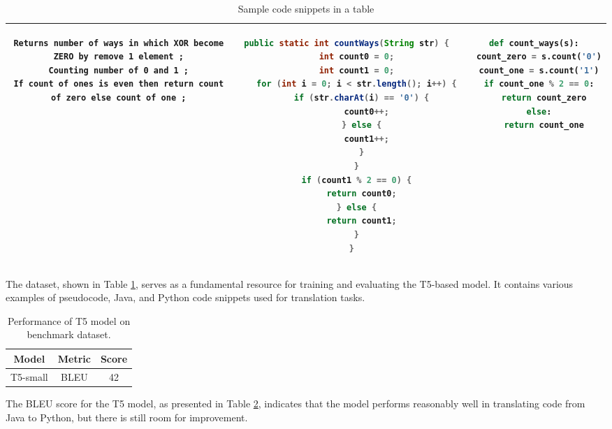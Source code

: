 \documentclass{dhbenelux}
\begin{document}
\begin{table}[h!]
{\begin{tabular}{|c|c|c|}
\begin{minipage}[t]{0.3\textwidth}
\begin{lstlisting}[basicstyle=\ttfamily\scriptsize, breaklines=true]
Returns number of ways in which XOR become ZERO by remove 1 element ;
Counting number of 0 and 1 ;
If count of ones is even then return count of zero else count of one ;
\end{lstlisting}
\end{minipage}
&
\begin{minipage}[t]{0.3\textwidth}
\begin{lstlisting}[language=Java, basicstyle=\ttfamily\scriptsize, breaklines=true]
public static int countWays(String str) {
    int count0 = 0;
    int count1 = 0;
    for (int i = 0; i < str.length(); i++) {
      if (str.charAt(i) == '0') {
        count0++;
      } else {
        count1++;
      }
    }
    if (count1 % 2 == 0) {
      return count0;
    } else {
      return count1;
    }
  }
\end{lstlisting}
\end{minipage}
&
\begin{minipage}[t]{0.3\textwidth}
\begin{lstlisting}[language=Python, basicstyle=\ttfamily\scriptsize, breaklines=true]
def count_ways(s):
  count_zero = s.count('0')
  count_one = s.count('1')
  if count_one % 2 == 0:
    return count_zero
  else:
    return count_one
\end{lstlisting}
\end{minipage}
\\
\hline
\end{tabular}
}
\caption{Sample code snippets in a table}
\label{tab:code-snippets}
\end{table}

The dataset, shown in Table \ref{tab:code-snippets}, serves as a fundamental resource for training and evaluating the T5-based model. It contains various examples of pseudocode, Java, and Python code snippets used for translation tasks.

\begin{table}[h!]
\centering
\begin{tabular}{|c|c|c|}
\hline
\textbf{Model} & \textbf{Metric} & \textbf{Score}\\
\hline
T5-small & BLEU & 42 \\
\hline
\end{tabular}
\caption{Performance of T5 model on benchmark dataset.}
\label{tab:bleu_results}
\end{table}

The BLEU score for the T5 model, as presented in Table \ref{tab:bleu_results}, indicates that the model performs reasonably well in translating code from Java to Python, but there is still room for improvement.
\end{document}
